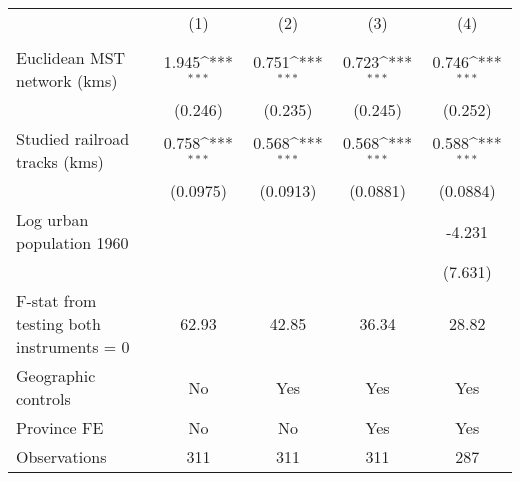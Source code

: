 {
\def\sym#1{\ifmmode^{#1}\else\(^{#1}\)\fi}
\begin{tabular}{l*{4}{c}}
\hline\hline
                &\multicolumn{1}{c}{(1)}&\multicolumn{1}{c}{(2)}&\multicolumn{1}{c}{(3)}&\multicolumn{1}{c}{(4)}\\
                &\multicolumn{1}{c}{}&\multicolumn{1}{c}{}&\multicolumn{1}{c}{}&\multicolumn{1}{c}{}\\
\hline
Euclidean MST network (kms)&    1.945\sym{***}&    0.751\sym{***}&    0.723\sym{***}&    0.746\sym{***}\\
                &  (0.246)         &  (0.235)         &  (0.245)         &  (0.252)         \\
[1em]
Studied railroad tracks (kms)&    0.758\sym{***}&    0.568\sym{***}&    0.568\sym{***}&    0.588\sym{***}\\
                & (0.0975)         & (0.0913)         & (0.0881)         & (0.0884)         \\
[1em]
Log urban population 1960&                  &                  &                  &   -4.231         \\
                &                  &                  &                  &  (7.631)         \\
\hline
F-stat from testing both instruments = 0&    62.93         &    42.85         &    36.34         &    28.82         \\
Geographic controls&       No         &      Yes         &      Yes         &      Yes         \\
Province FE     &       No         &       No         &      Yes         &      Yes         \\
Observations    &      311         &      311         &      311         &      287         \\
\hline\hline
\end{tabular}
}
